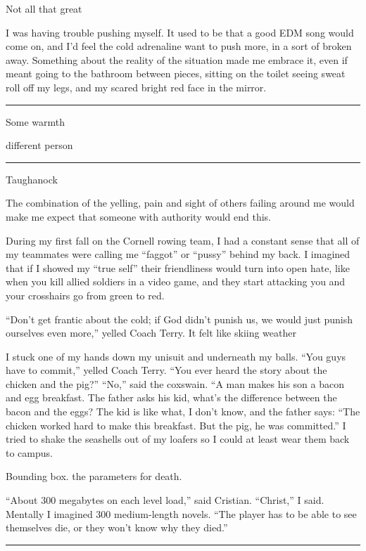 Not all that great

I was having trouble pushing myself.  It used to be that a good EDM song would
come on, and I'd feel the cold adrenaline want to push more, in a sort of broken
away.  Something about the reality of the situation made me embrace it, even if
meant going to the bathroom between pieces, sitting on the toilet seeing sweat
roll off my legs, and my scared bright red face in the mirror.  


\plainfancybreak{12pt}{2}{* * *}

Some warmth

different person

\plainfancybreak{12pt}{2}{* * *}

Taughanock

The combination of the yelling, pain and sight of others failing around me would
make me expect that someone with authority would end this.

During my first fall on the Cornell rowing team, I had a constant sense that
all of my teammates were calling me ``faggot'' or ``pussy'' behind my back.  I
imagined that if I showed my ``true self'' their friendliness would turn into
open hate, like when you kill allied soldiers in a video game, and they start
attacking you and your crosshairs go from green to red.  

``Don't get frantic about the cold; if God didn't punish us, we would just
punish ourselves even more,'' yelled Coach Terry.  It felt like skiing weather

I stuck one of my hands down my unisuit and underneath my balls.  ``You guys
have to commit,'' yelled Coach Terry.  ``You ever heard the story about the
chicken and the pig?'' ``No,'' said the coxswain.  ``A man makes his son a bacon
and egg breakfast.  The father asks his kid, what's the difference between the
bacon and the eggs?  The kid is like what, I don't know, and the father says:
``The chicken worked hard to make this breakfast.  But the pig, he was
committed.'' I tried to shake the seashells out of my loafers so I could at
least wear them back to campus. 

Bounding box.  the parameters for death.

``About 300 megabytes on each level load,'' said Cristian.  ``Christ,'' I said.
Mentally I imagined 300 medium-length novels.  ``The player has to be able to
see themselves die, or they won't know why they died.'' 

\plainfancybreak{12pt}{2}{* * *}

